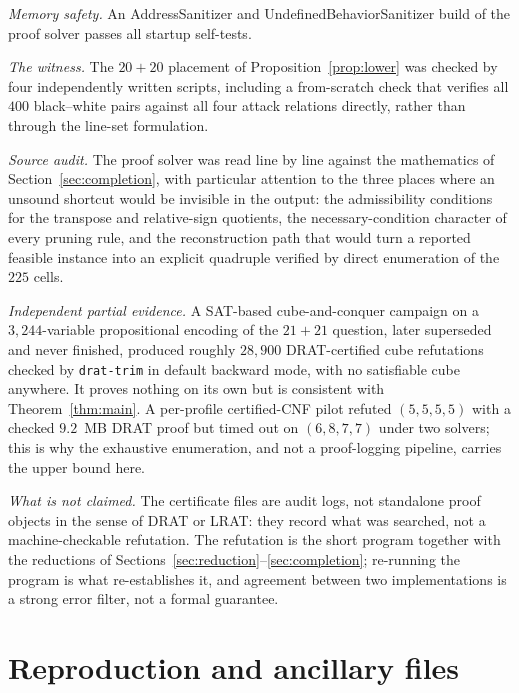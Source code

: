 \documentclass[11pt]{amsart}
\theoremstyle{remark}
\begin{document}
\emph{Memory safety.} An AddressSanitizer and UndefinedBehaviorSanitizer build of the proof solver passes all startup self-tests.

\emph{The witness.} The $20+20$ placement of Proposition~\ref{prop:lower} was checked by four independently written scripts, including a from-scratch check that verifies all $400$ black--white pairs against all four attack relations directly, rather than through the line-set formulation.

\emph{Source audit.} The proof solver was read line by line against the mathematics of Section~\ref{sec:completion}, with particular attention to the three places where an unsound shortcut would be invisible in the output: the admissibility conditions for the transpose and relative-sign quotients, the necessary-condition character of every pruning rule, and the reconstruction path that would turn a reported feasible instance into an explicit quadruple verified by direct enumeration of the $225$ cells.

\emph{Independent partial evidence.} A SAT-based cube-and-conquer campaign on a $3{,}244$-variable propositional encoding of the $21+21$ question, later superseded and never finished, produced roughly $28{,}900$ DRAT-certified cube refutations checked by \texttt{drat-trim} in default backward mode, with no satisfiable cube anywhere. It proves nothing on its own but is consistent with Theorem~\ref{thm:main}. A per-profile certified-CNF pilot refuted $(5,5,5,5)$ with a checked $9.2$~MB DRAT proof but timed out on $(6,8,7,7)$ under two solvers; this is why the exhaustive enumeration, and not a proof-logging pipeline, carries the upper bound here.

\emph{What is not claimed.} The certificate files are audit logs, not standalone proof objects in the sense of DRAT or LRAT: they record what was searched, not a machine-checkable refutation. The refutation is the short program together with the reductions of Sections~\ref{sec:reduction}--\ref{sec:completion}; re-running the program is what re-establishes it, and agreement between two implementations is a strong error filter, not a formal guarantee.

\section{Reproduction and ancillary files}\label{sec:repro}
\end{document}
